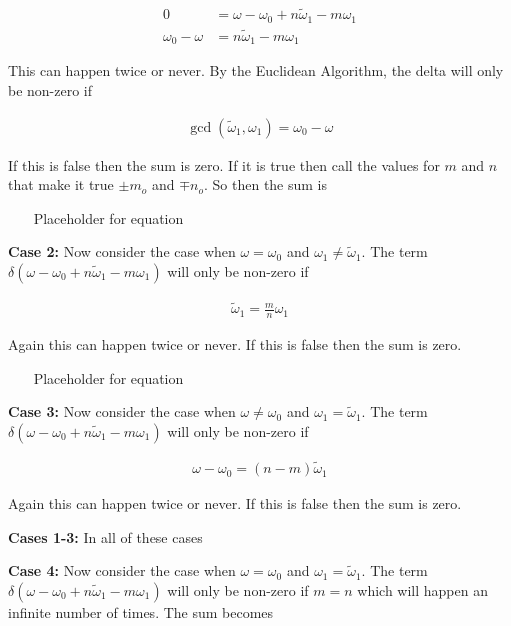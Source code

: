 \documentclass[onecolumn, groupedaddress, 10pt]{revtex4-1}
\begin{document}
\begin{align}
                0 &= \omega - \omega_0 + n\widetilde{\omega}_1 - m\omega_1		\\
\omega_0 - \omega &= n\widetilde{\omega}_1 - m\omega_1
\end{align}

This can happen twice or never.  By the Euclidean Algorithm, the delta will only be non-zero if

\begin{align}
\gcd \left( \widetilde{\omega}_1, \omega_1 \right) = \omega_0 - \omega
\end{align}

If this is false then the sum is zero.  If it is true then call the values for $m$ and $n$ that make it true $\pm m_o$ and $\mp n_o$.  So then the sum is 


~~~ Placeholder for equation ~~~


\textbf{Case 2:}  Now consider the case when $\omega = \omega_0$ and $\omega_1 \neq \widetilde{\omega}_1$.  The term $\delta(\omega - \omega_0 + n\widetilde{\omega}_1 - m\omega_1)$ will only be non-zero if

\begin{align}
\widetilde{\omega}_1 = \frac{m}{n} \omega_1
\end{align}

Again this can happen twice or never.  If this is false then the sum is zero.


~~~ Placeholder for equation ~~~


\textbf{Case 3:}  Now consider the case when $\omega \neq \omega_0$ and $\omega_1 = \widetilde{\omega}_1$.  The term $\delta(\omega - \omega_0 + n\widetilde{\omega}_1 - m\omega_1)$ will only be non-zero if

\begin{align}
\omega - \omega_0 = (n-m)\widetilde{\omega}_1
\end{align}

Again this can happen twice or never.  If this is false then the sum is zero.


\textbf{Cases 1-3:}  In all of these cases

\textbf{Case 4:}  Now consider the case when $\omega = \omega_0$ and $\omega_1 = \widetilde{\omega}_1$.  The term $\delta(\omega - \omega_0 + n\widetilde{\omega}_1 - m\omega_1)$ will only be non-zero if $m=n$ which will happen an infinite number of times.  The sum becomes
\end{document}
